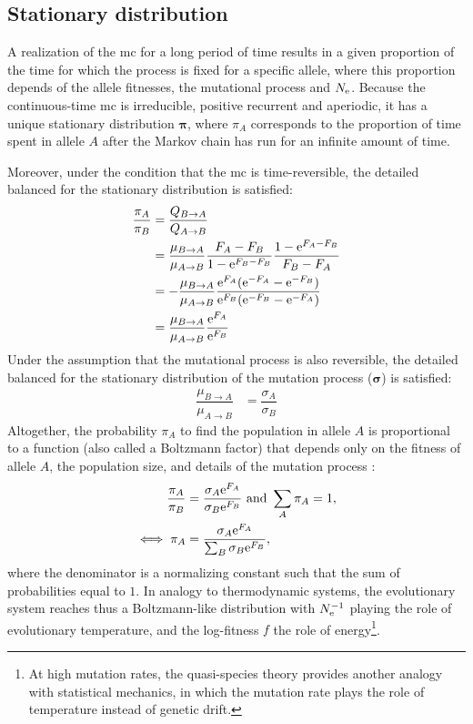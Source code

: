 \subsection{Stationary distribution}

A realization of the \gls{mc} for a long period of time results in a given proportion of the time for which the process is fixed for a specific allele, where this proportion depends of the allele fitnesses, the mutational process and $N_{\textrm{e}}$.
Because the continuous-time \gls{mc} is irreducible, positive recurrent and aperiodic, it has a unique stationary distribution $\bm{\pi}$, where $\pi_{A}$ corresponds to the proportion of time spent in allele $A$ after the Markov chain has run for an infinite amount of time. 

Moreover, under the condition that the \gls{mc} is time-reversible, the detailed balanced for the stationary distribution is satisfied:
\begin{align}
\dfrac{\pi_{A}}{\pi_{B}} & = \dfrac{Q_{B \to A}}{Q_{A \to B}} \\
& = \dfrac{\mu_{B \to A}}{\mu_{A \to B}}  \dfrac{F_{A}-F_{B}}{ 1 - \mathrm{e}^{F_{B}-F_{B}}}  \dfrac{1 - \mathrm{e}^{F_{A} - F_{B}} }{F_{B} - F_{A}}\\
& = - \dfrac{\mu_{B \to A}}{\mu_{A \to B}}  \dfrac{ \mathrm{e}^{F_{A}}(\mathrm{e}^{-F_{A}} - \mathrm{e}^{- F_{B}}) }{ \mathrm{e}^{F_{B}}(\mathrm{e}^{-F_{B}} - \mathrm{e}^{- F_{A}})}  \\
& = \dfrac{\mu_{B \to A}}{\mu_{A \to B}} \dfrac{\mathrm{e}^{F_{A}}}{\mathrm{e}^{F_{B}}} \\
\end{align}
Under the assumption that the mutational process is also reversible, the detailed balanced for the stationary distribution of the mutation process ($\bm{\sigma}$) is satisfied:
\begin{align}
\dfrac{\mu_{B \to A}}{\mu_{A \to B}} & = \dfrac{\sigma_{A}}{\sigma_{B}} 
\end{align}
Altogether, the probability $\pi_{A}$ to find the population in allele $A$ is proportional to a function (also called a Boltzmann factor) that depends only on the fitness of allele $A$, the population size, and details of the mutation process \citep{Sella2005,Mustonen2005}:
\begin{align}
\dfrac{\pi_{A}}{\pi_{B}} & = \dfrac{\sigma_{A}\mathrm{e}^{F_{A}}}{\sigma_{B}\mathrm{e}^{F_{B}}} \text{ and } \sum_{A}\pi_{A} = 1, \\ 
\iff \pi_{A} & = \dfrac{\sigma_{A}\mathrm{e}^{F_{A}}}{\sum_{B} \sigma_{B}\mathrm{e}^{F_{B}} }, \label{eq:equilibrium-mut-sel}
\end{align}
where the denominator is a normalizing constant such that the sum of probabilities equal to $1$.
In analogy to thermodynamic systems, the evolutionary system reaches thus a Boltzmann-like distribution with $N_{\textrm{e}}^{-1}$ playing the role of evolutionary temperature, and the log-fitness $f$ the role of energy\footnote{At high mutation rates, the quasi-species theory provides another analogy with statistical mechanics, in which the mutation rate plays the role of temperature instead of genetic drift.}.

